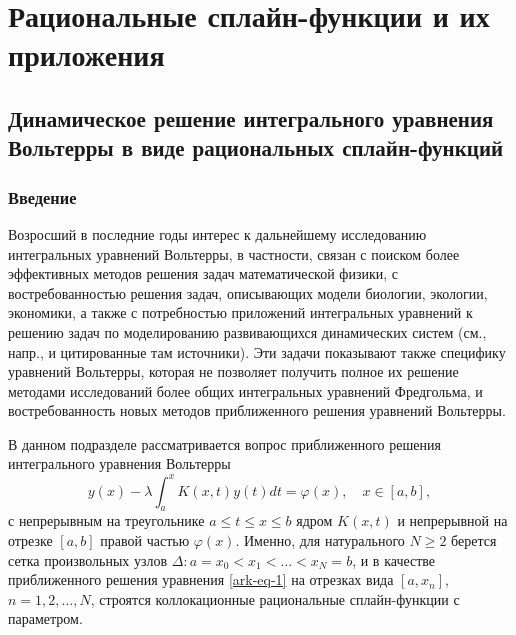 \chapter{Рациональные сплайн-функции и их приложения}\label{ARK}

\section{Динамическое решение интегрального уравнения Вольтерры в виде
рациональных сплайн-функций}
%

\subsection{Введение}

Возросший в последние годы интерес к дальнейшему исследованию интегральных уравнений
Вольтерры, в частности, связан с поиском более эффективных методов решения задач
математической физики, с востребованностью решения задач, описывающих модели
биологии, экологии, экономики, а также с потребностью приложений интегральных уравнений
к решению задач по моделированию развивающихся динамических систем (см., напр., \cite{ark-3}
и цитированные там источники). Эти задачи показывают также специфику
уравнений Вольтерры, которая не позволяет получить полное их решение методами
исследований более общих интегральных уравнений Фредгольма, и востребованность новых методов
приближенного решения уравнений Вольтерры.

В данном подразделе рассматривается вопрос приближенного решения интегрального уравнения
 Вольтерры
\begin{equation}\label{ark-eq-1}
y(x)-\lambda \int_a^x K(x,t)y(t) dt=\varphi(x),\quad x\in[a,b],
\end{equation}
с непрерывным на треугольнике $a\leqslant t\leqslant x\leqslant b$ ядром $K(x,t)$
и непрерывной на отрезке $[a,b]$ правой частью $\varphi(x)$. Именно, для натурального
$N\geqslant 2$ берется сетка произвольных узлов $\Delta:a=x_0<x_1<\dots <x_N=b$,  и
в качестве приближенного решения уравнения \eqref{ark-eq-1} на отрезках вида $[a,x_n]$,
$n=1,2,\dots,N$, строятся коллокационные рациональные сплайн-функции с параметром.

